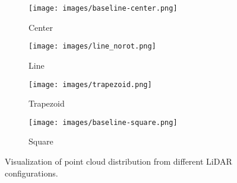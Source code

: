 \documentclass[10pt,twocolumn,letterpaper]{article}
\begin{document}
\begin{figure*}[t]
    \begin{subfigure}[b]{0.23\textwidth}
  \texttt{[image: images/baseline-center.png]}
                \caption{Center}
    \end{subfigure}%
    \begin{subfigure}[b]{0.23\textwidth}
  \texttt{[image: images/line\_norot.png]}
                \caption{Line}
    \end{subfigure}%
    \begin{subfigure}[b]{0.23\textwidth}
  \texttt{[image: images/trapezoid.png]}
                \caption{Trapezoid}
    \end{subfigure}%
    \begin{subfigure}[b]{0.23\textwidth}
  \texttt{[image: images/baseline-square.png]}
                \caption{Square}
    \end{subfigure}%
  \caption{Visualization of point cloud distribution from different LiDAR configurations.}
  \label{fig:vis1}
   \vspace*{-3mm}
\end{figure*}
\end{document}
